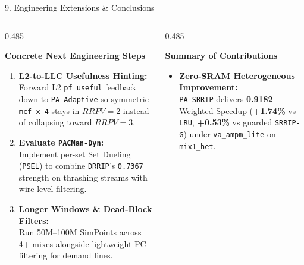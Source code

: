 \documentclass[aspectratio=169, 10pt]{beamer}
\begin{document}
\begin{frame}{9. Engineering Extensions \& Conclusions}
  \vspace{-0.18cm}
  \begin{columns}[t, onlytextwidth]
    \begin{column}{0.485\textwidth}
      \begin{tcolorbox}[archpanel, top=1.1mm, bottom=1.1mm]
        {\footnotesize\textbf{\color{Obsidian}Concrete Next Engineering Steps}}\par\vspace{0.05cm}
        \begin{enumerate}\setlength{\itemsep}{0.12em}\scriptsize
          \item \textbf{L2-to-LLC Usefulness Hinting:}\\
            Forward L2 \texttt{pf\_useful} feedback down to \texttt{PA-Adaptive} so symmetric \texttt{mcf x 4} stays in $RRPV=2$ instead of collapsing toward $RRPV=3$.
          \item \textbf{Evaluate \texttt{PACMan-Dyn}:}\\
            Implement per-set Set Dueling (\texttt{PSEL}) to combine \texttt{DRRIP}'s \texttt{0.7367} strength on thrashing streams with wire-level filtering.
          \item \textbf{Longer Windows \& Dead-Block Filters:}\\
            Run 50M--100M SimPoints across 4+ mixes alongside lightweight PC filtering for demand lines.
        \end{enumerate}
      \end{tcolorbox}
    \end{column}%
    \hfill%
    \begin{column}{0.485\textwidth}
      \begin{tcolorbox}[tealpanel, top=1.1mm, bottom=1.1mm]
        {\footnotesize\textbf{\color{Obsidian}Summary of Contributions}}\par\vspace{0.05cm}
        \begin{itemize}\setlength{\itemsep}{0.12em}\scriptsize
          \item \textbf{Zero-SRAM Heterogeneous Improvement:}\\
            \texttt{PA-SRRIP} delivers \textbf{0.9182} Weighted Speedup (\textbf{+1.74\%} vs \texttt{LRU}, \textbf{+0.53\%} vs guarded \texttt{SRRIP-G}) under \texttt{va\_ampm\_lite} on \texttt{mix1\_het}.

\end{itemize}
\end{tcolorbox}
\end{column}
\end{columns}
\end{frame}
\end{document}
